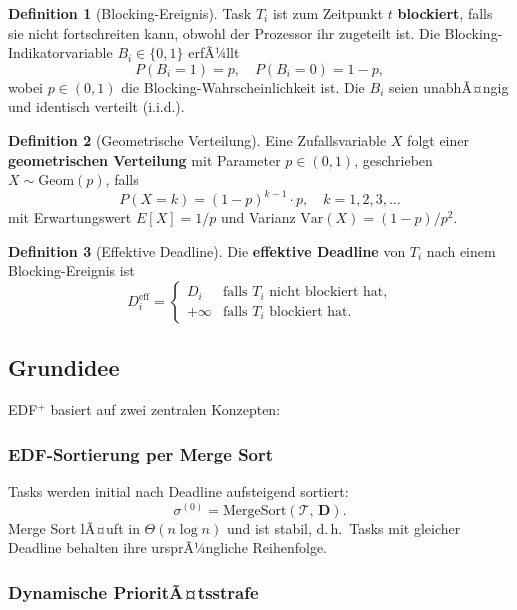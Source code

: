 ﻿\documentclass[a4paper,12pt]{article}
\theoremstyle{definition}
\newtheorem{definition}{Definition}
\begin{document}
	\begin{definition}[Blocking-Ereignis]
		Task $T_i$ ist zum Zeitpunkt $t$ \textbf{blockiert}, falls sie nicht
		fortschreiten kann, obwohl der Prozessor ihr zugeteilt ist. Die Blocking-Indikatorvariable $B_i \in \{0,1\}$ erfÃ¼llt
		\[
		P(B_i = 1) = p, \quad P(B_i = 0) = 1-p,
		\]
		wobei $p \in (0,1)$ die Blocking-Wahrscheinlichkeit ist. Die $B_i$ seien
		unabhÃ¤ngig und identisch verteilt (i.i.d.).
	\end{definition}
	
	\begin{definition}[Geometrische Verteilung]
		Eine Zufallsvariable $X$ folgt einer \textbf{geometrischen Verteilung} mit
		Parameter $p \in (0,1)$, geschrieben $X \sim \mathrm{Geom}(p)$, falls
		\[
		P(X = k) = (1-p)^{k-1} \cdot p, \quad k = 1, 2, 3, \ldots
		\]
		mit Erwartungswert $E[X] = 1/p$ und Varianz $\mathrm{Var}(X) = (1-p)/p^2$.
	\end{definition}
	
	\begin{definition}[Effektive Deadline]
		Die \textbf{effektive Deadline} von $T_i$ nach einem Blocking-Ereignis ist
		\[
		D_i^{\text{eff}} = \begin{cases}
			D_i & \text{falls } T_i \text{ nicht blockiert hat,} \\
			+\infty & \text{falls } T_i \text{ blockiert hat.}
		\end{cases}
		\]
	\end{definition}
	
	\subsection{Grundidee}
	
	EDF$^+$ basiert auf zwei zentralen Konzepten:
	
	\subsubsection{EDF-Sortierung per Merge Sort}
	
	Tasks werden initial nach Deadline aufsteigend sortiert:
	\[
	\sigma^{(0)} = \mathrm{MergeSort}(\mathcal{T},\, \mathbf{D}).
	\]
	Merge Sort lÃ¤uft in $\Theta(n \log n)$ und ist stabil, d.\,h.\ Tasks mit
	gleicher Deadline behal\-ten ihre ursprÃ¼ngliche Reihenfolge.
	
	\subsubsection{Dynamische PrioritÃ¤tsstrafe}
	
\end{document}
